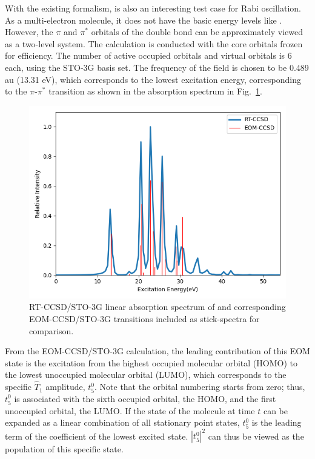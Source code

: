 \label{results-cc3-312}
With the existing formalism,  is also an interesting test case for Rabi oscillation. As a multi-electron molecule, it does not have the basic energy levels like . However, the $\pi$ and $\pi^{*}$ orbitals of the double bond can be approximately viewed as a two-level system. The calculation is conducted with the core orbitals frozen for efficiency. The number of active occupied orbitals and virtual orbitals is 6 each, using the STO-3G basis set. The frequency of the field is chosen to be 0.489 au (13.31 eV), which corresponds to the lowest excitation energy, corresponding to the $\pi$-$\pi^{*}$ transition as shown in the absorption spectrum in Fig.~\ref{fig:c2h4-abs}.
\begin{figure}
   \centering
   \includegraphics[angle=0, scale=0.43]{ch4/Figs/8-1.png}
   \caption{RT-CCSD/STO-3G linear absorption spectrum of  and corresponding EOM-CCSD/STO-3G transitions included as stick-spectra for comparison.}
     \label{fig:c2h4-abs}
\end{figure}

From the EOM-CCSD/STO-3G calculation, the leading contribution of this EOM state is the excitation from the highest occupied molecular orbital (HOMO) to the lowest unoccupied molecular orbital (LUMO), which corresponds to the specific $\hat{T}_{1}$ amplitude, $t_{5}^{0}$. Note that the orbital numbering starts from zero; thus, $t_{5}^{0}$ is associated with the sixth occupied orbital, the HOMO, and the first unoccupied orbital, the LUMO. If the state of the molecule at time $t$ can be expanded as a linear combination of all stationary point states, $t_{5}^{0}$ is the leading term of the coefficient of the lowest excited state. $|t_{5}^{0}|^{2}$ can thus be viewed as the population of this specific state. 

